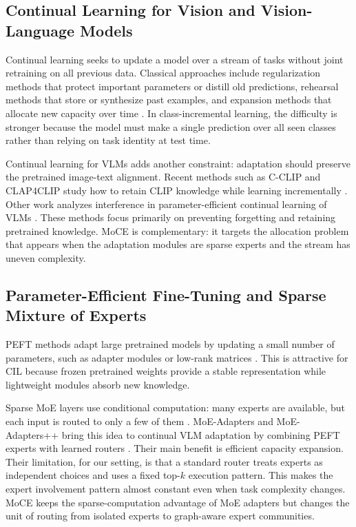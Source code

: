 \documentclass{article}
\theoremstyle{definition}
\theoremstyle{remark}
\begin{document}
\subsection{Continual Learning for Vision and Vision-Language Models}
Continual learning seeks to update a model over a stream of tasks without joint retraining on all previous data. Classical approaches include regularization methods that protect important parameters or distill old predictions, rehearsal methods that store or synthesize past examples, and expansion methods that allocate new capacity over time \cite{kirkpatrick2017overcoming,li2017learningwithoutforgetting,rebuffi2017icarl,douillard2022dytoxtransformerscontinuallearning,Zhou_2024}. In class-incremental learning, the difficulty is stronger because the model must make a single prediction over all seen classes rather than relying on task identity at test time.

Continual learning for VLMs adds another constraint: adaptation should preserve the pretrained image-text alignment. Recent methods such as C-CLIP and CLAP4CLIP study how to retain CLIP knowledge while learning incrementally \cite{liu2025cclip,jha2024clap4clip}. Other work analyzes interference in parameter-efficient continual learning of VLMs \cite{tang2024mindinterferenceretainingpretrained}. These methods focus primarily on preventing forgetting and retaining pretrained knowledge. MoCE is complementary: it targets the allocation problem that appears when the adaptation modules are sparse experts and the stream has uneven complexity.

\subsection{Parameter-Efficient Fine-Tuning and Sparse Mixture of Experts}
PEFT methods adapt large pretrained models by updating a small number of parameters, such as adapter modules or low-rank matrices \cite{houlsby2019parameter,hu2022lora,han2024parameterefficientfinetuninglargemodels}. This is attractive for CIL because frozen pretrained weights provide a stable representation while lightweight modules absorb new knowledge.

Sparse MoE layers use conditional computation: many experts are available, but each input is routed to only a few of them \cite{shazeer2017outrageously,fedus2022switch}. MoE-Adapters and MoE-Adapters++ bring this idea to continual VLM adaptation by combining PEFT experts with learned routers \cite{yu2024boostingcontinuallearningvisionlanguage,11122658}. Their main benefit is efficient capacity expansion. Their limitation, for our setting, is that a standard router treats experts as independent choices and uses a fixed top-$k$ execution pattern. This makes the expert involvement pattern almost constant even when task complexity changes. MoCE keeps the sparse-computation advantage of MoE adapters but changes the unit of routing from isolated experts to graph-aware expert communities.
\end{document}
